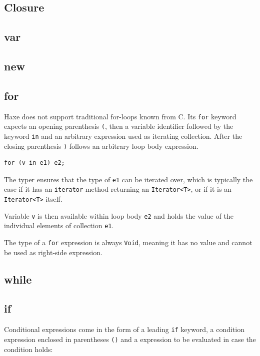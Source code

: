 \documentclass{article}
\newcommand{\type}[1]{\texttt{#1}}
\newcommand{\expr}[1]{\texttt{#1}}
\begin{document}
\subsection{Closure}
\label{Closure}
\label{function}

\subsection{var}
\label{var}

\subsection{new}
\label{new}

\subsection{for}

Haxe does not support traditional for-loops known from C. Its \expr{for} keyword expects an opening parenthesis \expr{(}, then a variable identifier followed by the keyword \expr{in} and an arbitrary expression used as iterating collection. After the closing parenthesis \expr{)} follows an arbitrary loop body expression.

\begin{lstlisting}
for (v in e1) e2;
\end{lstlisting}

The typer ensures that the type of \expr{e1} can be iterated over, which is typically the case if it has an \expr{iterator} method returning an \type{Iterator<T>}, or if it is an \type{Iterator<T>} itself.

Variable \expr{v} is then available within loop body \expr{e2} and holds the value of the individual elements of collection \expr{e1}.

The type of a \expr{for} expression is always \type{Void}, meaning it has no value and cannot be used as right-side expression.

\subsection{while}
\label{while}

\subsection{if}
\label{if}

Conditional expressions come in the form of a leading \expr{if} keyword, a condition expression enclosed in parentheses \expr{()} and a expression to be evaluated in case the condition holds:
\end{document}
